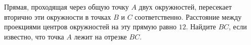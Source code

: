 \begin{ex}
	\begin{condition}
		Прямая, проходящая через общую точку \( A  \) двух окружностей, пересекает вторично эти окружности в точках \( B \)	и \( C  \) соответственно. Расстояние между проекциями центров окружностей на эту прямую равно \( 12  \). Найдите \( BC \), если известно, что точка \( A  \) лежит на отрезке \( BC \).
	\end{condition}
\end{ex}